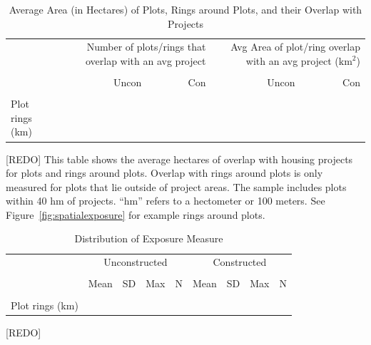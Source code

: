 \documentclass[12pt]{article}
\newcommand{\hmref}{
	``hm'' refers to a hectometer or 100 meters.
}
\begin{document}
\begin{table}
\small
\centering
\caption{Average Area (in Hectares) of Plots, Rings around Plots, and their Overlap with Projects}\label{table:spatialsummary}
\vspace{-2mm}
\begin{threeparttable}
\begin{tabular}{lrrrr}
\toprule
 & \multicolumn{2}{G}{Number of plots/rings that overlap with an avg project} & \multicolumn{2}{G}{Avg Area of plot/ring overlap with an avg project ($\text{km}^{2}$)}  \\
\\[-.5em]
& Uncon & Con & Uncon & Con \\
\midrule
	
\\[-.5em]
Plot rings (km) \\

\bottomrule
\end{tabular}
\begin{tablenotes}
\item \footnotesize  [REDO] This table shows the average hectares of overlap with housing projects for plots and rings around plots.  Overlap with rings around plots is only measured for plots that lie outside of project areas.  The sample includes plots within 40 hm of projects. \hmref  See Figure~\ref{fig:spatialexposure} for example rings around plots.
\end{tablenotes}
\end{threeparttable}
\end{table}

\begin{table}
\small
\centering
\caption{Distribution of Exposure Measure}\label{table:spatialsummaryexposure}
\vspace{-2mm}
\begin{threeparttable}
\begin{tabular}{lrrrrrrrr}
\toprule
 & \multicolumn{4}{c}{Unconstructed} & \multicolumn{4}{c}{Constructed}  \\\cmidrule(lr){2-5}\cmidrule(lr){6-9}
\\[-.7em]
& Mean & SD & Max & N & Mean & SD & Max & N \\
\midrule

\\[-.5em]
Plot rings (km) \\
	
\bottomrule
\end{tabular}
\begin{tablenotes}
\item \footnotesize  [REDO] 
\end{tablenotes}
\end{threeparttable}
\end{table}
\end{document}
